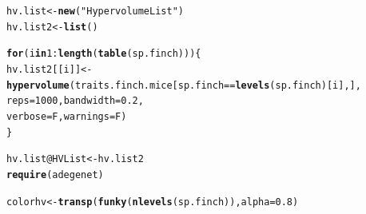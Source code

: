 \documentclass[12pt]{article}\usepackage[]{graphicx}\usepackage[]{color}
\makeatletter
\newcommand{\hlnum}[1]{\textcolor[rgb]{0.686,0.059,0.569}{#1}}%
\newcommand{\hlstr}[1]{\textcolor[rgb]{0.192,0.494,0.8}{#1}}%
\newcommand{\hlopt}[1]{\textcolor[rgb]{0,0,0}{#1}}%
\newcommand{\hlstd}[1]{\textcolor[rgb]{0.345,0.345,0.345}{#1}}%
\newcommand{\hlkwa}[1]{\textcolor[rgb]{0.161,0.373,0.58}{\textbf{#1}}}%
\newcommand{\hlkwb}[1]{\textcolor[rgb]{0.69,0.353,0.396}{#1}}%
\newcommand{\hlkwc}[1]{\textcolor[rgb]{0.333,0.667,0.333}{#1}}%
\newcommand{\hlkwd}[1]{\textcolor[rgb]{0.737,0.353,0.396}{\textbf{#1}}}%
\newenvironment{kframe}{%
 \def\at@end@of@kframe{}%
 \ifinner\ifhmode%
  \def\at@end@of@kframe{\end{minipage}}%
  \begin{minipage}{\columnwidth}%
 \fi\fi%
 \def\FrameCommand##1{\hskip\@totalleftmargin \hskip-\fboxsep
 \colorbox{shadecolor}{##1}\hskip-\fboxsep
     \hskip-\linewidth \hskip-\@totalleftmargin \hskip\columnwidth}%
 \MakeFramed {\advance\hsize-\width
   \@totalleftmargin\z@ \linewidth\hsize
   \@setminipage}}%
 {\par\unskip\endMakeFramed%
 \at@end@of@kframe}
\newenvironment{knitrout}{}{} %
\makeatother
\begin{document}
\begin{knitrout}
\color{fgcolor}\begin{kframe}
\begin{alltt}
\hlstd{hv.list}\hlkwb{<-}\hlkwd{new}\hlstd{(}\hlstr{"HypervolumeList"}\hlstd{)}
\hlstd{hv.list2}\hlkwb{<-}\hlkwd{list}\hlstd{()}

\hlkwa{for}\hlstd{(i} \hlkwa{in} \hlnum{1}\hlopt{:} \hlkwd{length}\hlstd{(}\hlkwd{table}\hlstd{(sp.finch))) \{}
 \hlstd{hv.list2[[i]]}\hlkwb{<-}\hlkwd{hypervolume}\hlstd{(traits.finch.mice[sp.finch} \hlopt{==} \hlkwd{levels}\hlstd{(sp.finch)[i], ],}
        \hlkwc{reps} \hlstd{=} \hlnum{1000}\hlstd{,}\hlkwc{bandwidth} \hlstd{=} \hlnum{0.2}\hlstd{,}
        \hlkwc{verbose} \hlstd{= F,} \hlkwc{warnings} \hlstd{= F)}
\hlstd{\}}

\hlstd{hv.list}\hlopt{@}\hlkwc{HVList}\hlkwb{<-}\hlstd{hv.list2}
\hlkwd{require}\hlstd{(adegenet)}
\end{alltt}


{\ttfamily\noindent\itshape\color{messagecolor}{\#\# Loading required package: adegenet\\\#\#\ \ \ \ ==========================\\\#\#\ \ \ \  adegenet 1.4-2 is loaded\\\#\#\ \ \ \ ==========================\\\#\# \\\#\#\ \ - to start, type '?adegenet'\\\#\#\ \ - to browse adegenet website, type 'adegenetWeb()'\\\#\#\ \ - to post questions/comments: adegenet-forum@lists.r-forge.r-project.org}}\begin{alltt}
\hlstd{colorhv}\hlkwb{<-}\hlkwd{transp}\hlstd{(}\hlkwd{funky}\hlstd{(}\hlkwd{nlevels}\hlstd{(sp.finch)),} \hlkwc{alpha} \hlstd{=} \hlnum{0.8}\hlstd{)}


\end{alltt}
\end{kframe}
\end{knitrout}
\end{document}
